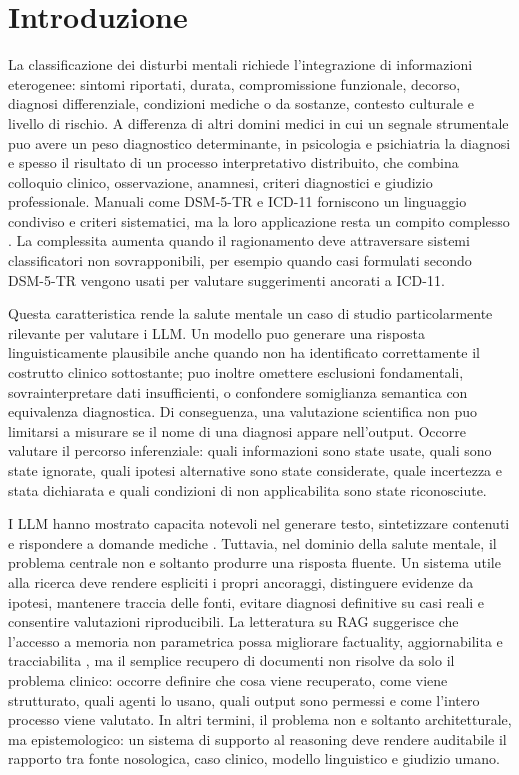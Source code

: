 \documentclass[11pt,a4paper]{article}
\begin{document}
\section{Introduzione}
La classificazione dei disturbi mentali richiede l'integrazione di informazioni eterogenee: sintomi riportati, durata, compromissione funzionale, decorso, diagnosi differenziale, condizioni mediche o da sostanze, contesto culturale e livello di rischio. A differenza di altri domini medici in cui un segnale strumentale puo avere un peso diagnostico determinante, in psicologia e psichiatria la diagnosi e spesso il risultato di un processo interpretativo distribuito, che combina colloquio clinico, osservazione, anamnesi, criteri diagnostici e giudizio professionale. Manuali come DSM-5-TR e ICD-11 forniscono un linguaggio condiviso e criteri sistematici, ma la loro applicazione resta un compito complesso \citep{apa2022dsm5tr,who2022icd11,who2024cddr}. La complessita aumenta quando il ragionamento deve attraversare sistemi classificatori non sovrapponibili, per esempio quando casi formulati secondo DSM-5-TR vengono usati per valutare suggerimenti ancorati a ICD-11.

Questa caratteristica rende la salute mentale un caso di studio particolarmente rilevante per valutare i LLM. Un modello puo generare una risposta linguisticamente plausibile anche quando non ha identificato correttamente il costrutto clinico sottostante; puo inoltre omettere esclusioni fondamentali, sovrainterpretare dati insufficienti, o confondere somiglianza semantica con equivalenza diagnostica. Di conseguenza, una valutazione scientifica non puo limitarsi a misurare se il nome di una diagnosi appare nell'output. Occorre valutare il percorso inferenziale: quali informazioni sono state usate, quali sono state ignorate, quali ipotesi alternative sono state considerate, quale incertezza e stata dichiarata e quali condizioni di non applicabilita sono state riconosciute.

I LLM hanno mostrato capacita notevoli nel generare testo, sintetizzare contenuti e rispondere a domande mediche \citep{singhal2023medpalm,peng2023medical}. Tuttavia, nel dominio della salute mentale, il problema centrale non e soltanto produrre una risposta fluente. Un sistema utile alla ricerca deve rendere espliciti i propri ancoraggi, distinguere evidenze da ipotesi, mantenere traccia delle fonti, evitare diagnosi definitive su casi reali e consentire valutazioni riproducibili. La letteratura su RAG suggerisce che l'accesso a memoria non parametrica possa migliorare factuality, aggiornabilita e tracciabilita \citep{lewis2020rag,li2022survey}, ma il semplice recupero di documenti non risolve da solo il problema clinico: occorre definire che cosa viene recuperato, come viene strutturato, quali agenti lo usano, quali output sono permessi e come l'intero processo viene valutato. In altri termini, il problema non e soltanto architetturale, ma epistemologico: un sistema di supporto al reasoning deve rendere auditabile il rapporto tra fonte nosologica, caso clinico, modello linguistico e giudizio umano.
\end{document}
